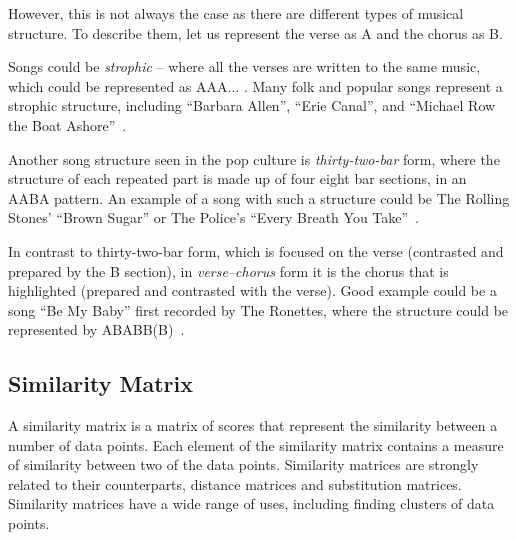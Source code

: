 However, this is not always the case as there are different types of musical structure. To describe them, let us represent the verse as A and the chorus as B. 

Songs could be \textit{strophic} -- where all the verses are written to the same music, which could be represented as AAA... . Many folk and popular songs represent a strophic structure, including ``Barbara Allen'', ``Erie Canal'', and ``Michael Row the Boat Ashore''~\cite{strophic}.

Another song structure seen in the pop culture is \textit{thirty-two-bar} form, where the structure of each repeated part is made up of four eight bar sections, in an AABA pattern. An example of a song with such a structure could be The Rolling Stones' ``Brown Sugar'' or The Police's ``Every Breath You Take''~\cite{32bar}. 

In contrast to thirty-two-bar form, which is focused on the verse (contrasted and prepared by the B section), in \textit{verse–chorus} form it is the chorus that is highlighted (prepared and contrasted with the verse). Good example could be a song ``Be My Baby'' first recorded by The Ronettes, where the structure could be represented by ABABB(B)~\cite{32bar}.



\subsection{Similarity Matrix}

A similarity matrix is a matrix of scores that represent the similarity between a number of data points. Each element of the similarity matrix contains a measure of similarity between two of the data points. Similarity matrices are strongly related to their counterparts, distance matrices and substitution matrices.
Similarity matrices have a wide range of uses, including finding clusters of data points.

